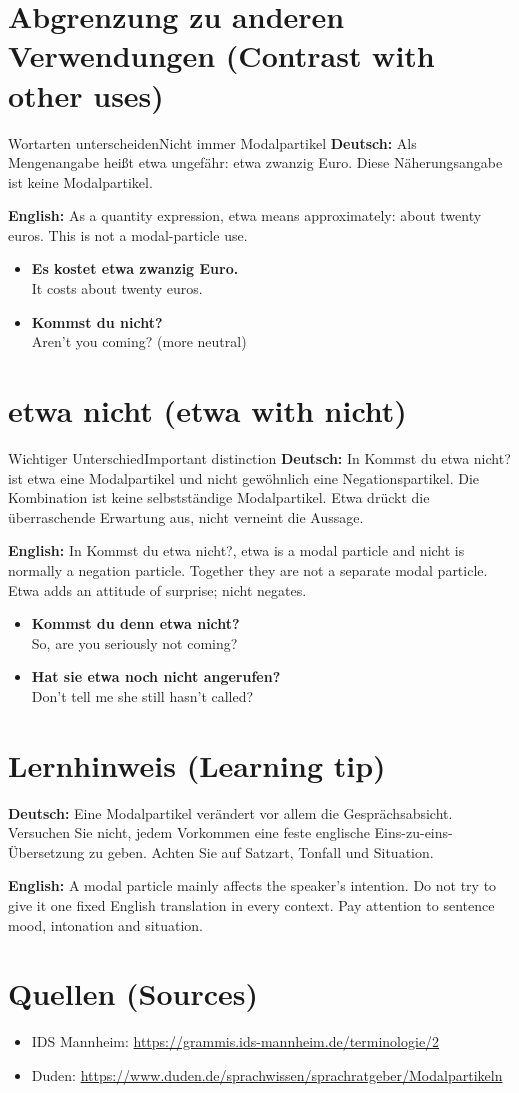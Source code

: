 \documentclass[a4paper,11pt]{article}
\newcommand{\GermanText}[1]{\textbf{Deutsch: }#1\par}
\newcommand{\EnglishText}[1]{{\small\color{SoftGray}\textbf{English: }#1\par}}
\newcommand{\ExampleItem}[2]{\item \textbf{#1}\\{\small\color{SoftGray}#2}}
\begin{document}
\section{Abgrenzung zu anderen Verwendungen \textnormal{(Contrast with other uses)}}
\begin{grammarentry}{Wortarten unterscheiden}{Nicht immer Modalpartikel}
\GermanText{Als Mengenangabe heißt etwa ungefähr: etwa zwanzig Euro. Diese Näherungsangabe ist keine Modalpartikel.}
\EnglishText{As a quantity expression, etwa means approximately: about twenty euros. This is not a modal-particle use.}
\end{grammarentry}
\begin{exbox}\begin{itemize}
\ExampleItem{Es kostet etwa zwanzig Euro.}{It costs about twenty euros.}
\ExampleItem{Kommst du nicht?}{Aren't you coming? (more neutral)}
\end{itemize}\end{exbox}
\section{etwa nicht \textnormal{(etwa with nicht)}}
\begin{grammarentry}{Wichtiger Unterschied}{Important distinction}
\GermanText{In Kommst du etwa nicht? ist etwa eine Modalpartikel und nicht gewöhnlich eine Negationspartikel. Die Kombination ist keine selbstständige Modalpartikel. Etwa drückt die überraschende Erwartung aus, nicht verneint die Aussage.}
\EnglishText{In Kommst du etwa nicht?, etwa is a modal particle and nicht is normally a negation particle. Together they are not a separate modal particle. Etwa adds an attitude of surprise; nicht negates.}
\end{grammarentry}
\begin{exbox}\begin{itemize}
\ExampleItem{Kommst du denn etwa nicht?}{So, are you seriously not coming?}
\ExampleItem{Hat sie etwa noch nicht angerufen?}{Don't tell me she still hasn't called?}
\end{itemize}\end{exbox}
\section{Lernhinweis \textnormal{(Learning tip)}}
\GermanText{Eine Modalpartikel verändert vor allem die Gesprächsabsicht. Versuchen Sie nicht, jedem Vorkommen eine feste englische Eins-zu-eins-Übersetzung zu geben. Achten Sie auf Satzart, Tonfall und Situation.}
\EnglishText{A modal particle mainly affects the speaker's intention. Do not try to give it one fixed English translation in every context. Pay attention to sentence mood, intonation and situation.}
\section{Quellen \textnormal{(Sources)}}
\begin{itemize}
\item IDS Mannheim: \url{https://grammis.ids-mannheim.de/terminologie/2}
\item Duden: \url{https://www.duden.de/sprachwissen/sprachratgeber/Modalpartikeln}
\end{itemize}
\end{document}
